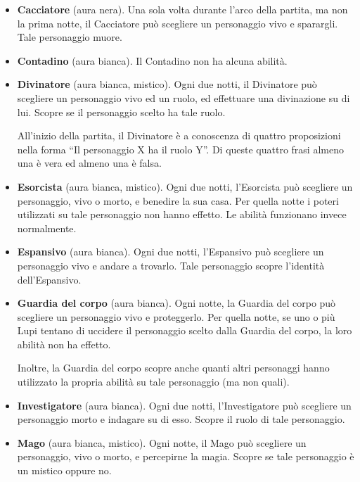 \documentclass[a4paper,10pt]{article}
\begin{document}
\begin{itemize}
	
	\item {\bf Cacciatore} (aura nera). Una sola volta durante l'arco della partita, ma non la prima notte, il Cacciatore può scegliere un personaggio vivo e sparargli. Tale personaggio muore.
	
	\item {\bf Contadino} (aura bianca). Il Contadino non ha alcuna abilità.

	\item {\bf Divinatore} (aura bianca, mistico). Ogni due notti, il Divinatore può scegliere un personaggio vivo ed un ruolo, ed effettuare una divinazione su di lui. Scopre se il personaggio scelto ha tale ruolo.
	
	All'inizio della partita, il Divinatore è a conoscenza di quattro proposizioni nella forma ``Il personaggio X ha il ruolo Y''. Di queste quattro frasi almeno una è vera ed almeno una è falsa.

	\item {\bf Esorcista} (aura bianca, mistico). Ogni due notti, l'Esorcista può scegliere un personaggio, vivo o morto, e benedire la sua casa. Per quella notte i poteri utilizzati su tale personaggio non hanno effetto. Le abilità funzionano invece normalmente.
 
	\item {\bf Espansivo} (aura bianca). Ogni due notti, l'Espansivo può scegliere un personaggio vivo e andare a trovarlo. Tale personaggio scopre l'identità dell'Espansivo.

	\item {\bf Guardia del corpo} (aura bianca). Ogni notte, la Guardia del corpo può scegliere un personaggio vivo e proteggerlo. Per quella notte, se uno o più Lupi tentano di uccidere il personaggio scelto dalla Guardia del corpo, la loro abilità non ha effetto.

	Inoltre, la Guardia del corpo scopre anche quanti altri personaggi hanno utilizzato la propria abilità su tale personaggio (ma non quali).
 
	\item {\bf Investigatore} (aura bianca). Ogni due notti, l'Investigatore può scegliere un personaggio morto e indagare su di esso. Scopre il ruolo di tale personaggio.

	\item {\bf Mago} (aura bianca, mistico). Ogni notte, il Mago può scegliere un personaggio, vivo o morto, e percepirne la magia. Scopre se tale personaggio è un mistico oppure no.
 

\end{itemize}
\end{document}
